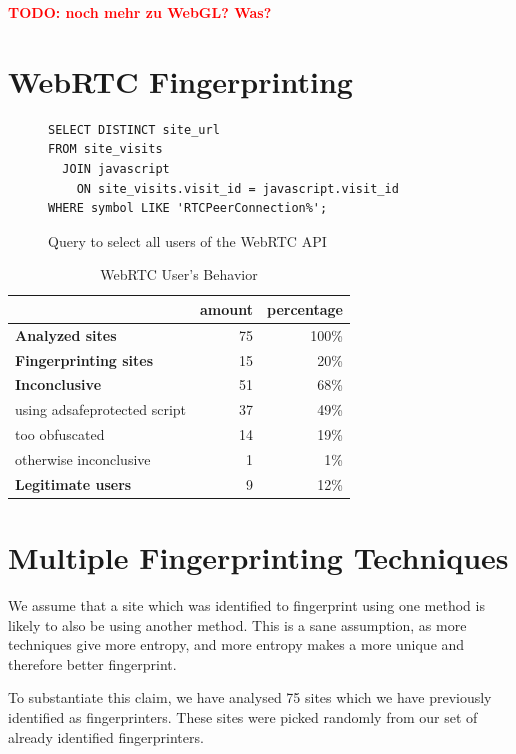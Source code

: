 \documentclass[
    fontsize=12pt,
    headings=small,
    parskip=half,
    bibliography=totoc,
    numbers=noenddot,
    open=any
    ]{scrreprt}
\newcommand{\todo}[1]{\textcolor{red}{\textbf{TODO: #1}}}
\begin{document}
\todo{noch mehr zu WebGL? Was?}


\section{WebRTC Fingerprinting}

\begin{figure}
\begin{verbatim}
SELECT DISTINCT site_url
FROM site_visits
  JOIN javascript
    ON site_visits.visit_id = javascript.visit_id
WHERE symbol LIKE 'RTCPeerConnection%';
\end{verbatim}
\caption{Query to select all users of the WebRTC API}
\label{code:webrtc_query}
\end{figure}

\begin{table}
\centering
\caption{WebRTC User's Behavior}
\begin{tabular}{l r r}
    \toprule
    & amount & percentage \\
    \midrule
    \textbf{Analyzed sites} & 75 & 100\% \\
    \midrule
    \textbf{Fingerprinting sites} & 15 & 20\% \\
    \midrule
    \textbf{Inconclusive} & 51 & 68\% \\
    using adsafeprotected script & 37 & 49\% \\
    too obfuscated & 14 & 19\% \\
    otherwise inconclusive & 1 & 1\% \\
    \midrule
    \textbf{Legitimate users} & 9 & 12\% \\
    \bottomrule
\end{tabular}
\label{table:webrtc_users}
\end{table}


\section{Multiple Fingerprinting Techniques}
\label{sec:correlation}
We assume that a site which was identified to fingerprint using one method is likely
to also be using another method.
This is a sane assumption, as more techniques give more entropy, and more entropy makes a more
unique and therefore better fingerprint.

To substantiate this claim, we have analysed 75 sites which we have previously identified as fingerprinters.
These sites were picked randomly from our set of already identified fingerprinters.
\end{document}
